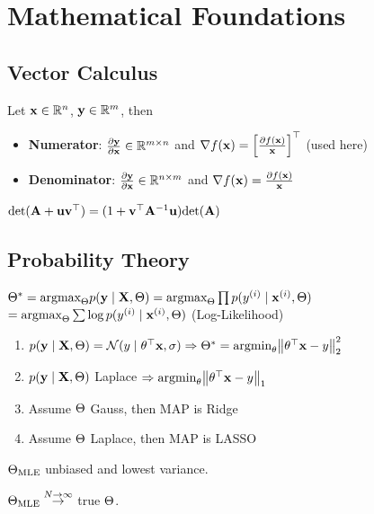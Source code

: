 \section{Mathematical Foundations}

\subsection{Vector Calculus}
Let \(\vb{x} \in \mathbb{R}^n\), \(\vb{y} \in \mathbb{R}^m\), then
\begin{itemize}
    \item \textbf{Numerator}: \(\frac{\partial \vb{y}}{\partial \vb{x}} \in \mathbb{R}^{m \times n}\) and \(\nabla f(\vb{x}) = \left[\frac{\partial f(\vb{x})}{\vb{x}}\right]^\top\) (used here)
    \item \textbf{Denominator}: \(\frac{\partial \vb{y}}{\partial \vb{x}} \in \mathbb{R}^{n \times m}\) and \(\nabla f(\vb{x}) = \frac{\partial f(\vb{x})}{\vb{x}}\)
\end{itemize}

\begin{definition}
    \(\text{det}(\vb{A} + \vb{u}\vb{v}^\top) = (1 + \vb{v}^\top \vb{A}^{-1} \vb{u})\text{det}(\vb{A})\)
\end{definition}

\subsection{Probability Theory}

\begin{definition}[MLE]
    \(\Theta^{*} = \text{argmax}_{\Theta} p(\vb{y} \mid \vb{X}, \Theta) = \text{argmax}_{\Theta} \prod p(y^{(i)} \mid \vb{x}^{(i)}, \Theta)\)\(= \text{argmax}_{\Theta} \sum \log p(y^{(i)} \mid \vb{x}^{(i)}, \Theta)\) (Log-Likelihood)
\end{definition}

\begin{colored}
    \begin{enumerate}
        \item \(p(\vb{y} \mid \vb{X}, \Theta) = \operatorname{\mathcal{N}}(y \mid \theta^\top \vb{x}, \sigma) \Rightarrow \Theta^* = \text{argmin}_{\theta} \norm{\theta^\top \vb{x} - y}_2^2\)
        \item \(p(\vb{y} \mid \vb{X}, \Theta)\) Laplace \(\Rightarrow \text{argmin}_{\theta} \norm{\theta^\top \vb{x} - y}_1\)
        \item Assume \(\Theta\) Gauss, then MAP is Ridge
        \item Assume \(\Theta\) Laplace, then MAP is LASSO
    \end{enumerate}

    \begin{itemize*}
        \item \(\Theta_{\operatorname{MLE}}\) unbiased and lowest variance. 
        \item \(\Theta_{\operatorname{MLE}} \overset{N \to \infty}{\to}\) true \(\Theta\).
    \end{itemize*}
\end{colored}


